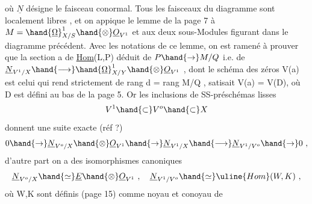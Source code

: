 où $\underline{N}$ désigne le faisceau conormal. Tous les faisceaux du diagramme sont
localement libres , et on appique le lemme de la page 7 à $M=\hand{\underline{\Omega}}^1_{X/S}\hand{\otimes}\underline{O}_{V^1}$
et aux deux sous-Modules figurant dans le diagramme précédent. Avec
les notations de ce lemme, on est ramené à prouver que la section a
 de \uline{Hom}(L,P) déduit de  $P\hand{\rightarrow} M/Q$ i.e. de \inserted{$\mu$:} $\underline{N}_{V^1/X}\hand{\longrightarrow}\hand{\underline{\Omega}}^1_{X/Y}\hand{\otimes}\underline{O}_{V^1}$ ,
dont le schéma des zéros V(a) est celui qui rend \hand{$\mu$} strictement de rang
\hand{$<$} d = rang M/Q , satisait V(a) = V(D), où D est défini au bas de la
page 5. Or les inclusions de SS-préschémas lisses
\margin{||}
\[ V^1 \hand{\subset} V^o \hand{\subset} X \]
donnent une suite exacte (réf ?)
\[ 0 \hand{\rightarrow} \underline{N}_{V^o/X}\hand{\otimes}\underline{O}_{V^1} \hand{\rightarrow} \underline{N}_{V^1/X} \hand{\longrightarrow} \underline{N}_{V^1/V^o} \hand{\rightarrow} 0 \ , \]
d'autre part on a des isomorphismes canoniques
\[ \underline{N}_{V^o/X} \hand{\simeq} \underline{E}\hand{\otimes}\underline{O}_{V^1} \ , \quad \underline{N}_{V^1/V^o} \hand{\simeq} \uline{Hom}(W,K) \ , \]
où W,K sont définis (page 15) comme noyau et conoyau de

